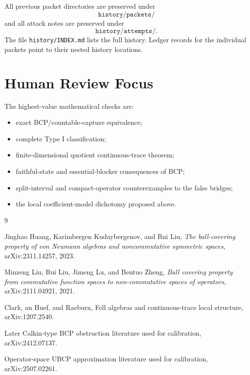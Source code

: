 \documentclass[11pt]{article}
\begin{document}
All previous packet directories are preserved under
\[
\texttt{history/packets/}
\]
and all attack notes are preserved under
\[
\texttt{history/attempts/}.
\]
The file \texttt{history/INDEX.md} lists the full history.  Ledger records for
the individual packets point to their nested history locations.

\section*{Human Review Focus}

The highest-value mathematical checks are:
\begin{itemize}
\item exact BCP/countable-capture equivalence;
\item complete Type I classification;
\item finite-dimensional quotient continuous-trace theorem;
\item faithful-state and essential-blocker consequences of BCP;
\item split-interval and compact-operator counterexamples to the false
bridges;
\item the local coefficient-model dichotomy proposed above.
\end{itemize}

\begin{thebibliography}{9}

Jinghao Huang, Karimbergen Kudaybergenov, and Rui Liu,
\emph{The ball-covering property of von Neumann algebras and noncommutative
symmetric spaces}, arXiv:2311.14257, 2023.

Minzeng Liu, Rui Liu, Jimeng Lu, and Bentuo Zheng,
\emph{Ball covering property from commutative function spaces to
non-commutative spaces of operators}, arXiv:2111.04921, 2021.

Clark, an Huef, and Raeburn,
Fell algebras and continuous-trace local structure,
arXiv:1207.2540.

Later Calkin-type BCP obstruction literature used for calibration,
arXiv:2412.07137.

Operator-space UBCP approximation literature used for calibration,
arXiv:2507.02261.

\end{thebibliography}
\end{document}
